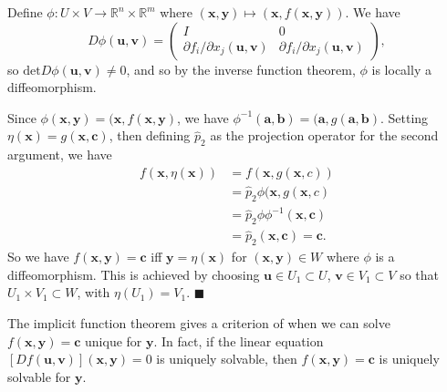 \documentclass[letter-paper]{tufte-book}
\newenvironment{proof}[1][Proof]{\begin{trivlist}
\item[\hskip \labelsep {\bfseries #1}]}{\end{trivlist}}
\newcommand{\qed}{\hfill$\blacksquare$}
\begin{document}
\begin{proof}
  Define $\phi : U \times V \to \mathbb{R}^n \times \mathbb{R}^m$ where
  $(\boldsymbol{x}, \boldsymbol{y}) \mapsto (\boldsymbol{x}, f(\boldsymbol{x},
  \boldsymbol{y}))$. We have
  \begin{equation*}
    D\phi(\boldsymbol{u}, \boldsymbol{v}) = \begin{pmatrix}I & 0 \\ \partial f_i/\partial x_j (\boldsymbol{u}, \boldsymbol{v}) & \partial f_i / \partial x_j (\boldsymbol{u}, \boldsymbol{v}) \end{pmatrix},
  \end{equation*}
  so $\mbox{det} D\phi(\boldsymbol{u}, \boldsymbol{v}) \neq 0$, and so by the
  inverse function theorem, $\phi$ is locally a diffeomorphism.
  
  Since $\phi(\boldsymbol{x}, \boldsymbol{y}) = (\boldsymbol{x},
  f(\boldsymbol{x}, \boldsymbol{y})$, we have $\phi^{-1}(\boldsymbol{a},
  \boldsymbol{b}) = (\boldsymbol{a}, g(\boldsymbol{a}, \boldsymbol{b})$. Setting
  $\eta(\boldsymbol{x}) = g(\boldsymbol{x}, \boldsymbol{c})$, then defining
  $\hat{p}_2$ as the projection operator for the second argument, we have
  \begin{align*}
    f(\boldsymbol{x}, \eta(\boldsymbol{x})) &= f(\boldsymbol{x}, g(\boldsymbol{x}, c)) \\
      &= \hat{p}_2 \phi(\boldsymbol{x}, g(\boldsymbol{x}, c) \\
      &= \hat{p}_2 \phi \phi^{-1} (\boldsymbol{x}, \boldsymbol{c}) \\
      &= \hat{p}_2(\boldsymbol{x}, \boldsymbol{c}) = \boldsymbol{c}.
  \end{align*}
  So we have $f(\boldsymbol{x}, \boldsymbol{y}) = \boldsymbol{c}$ iff
  $\boldsymbol{y} = \eta(\boldsymbol{x})$ for $(\boldsymbol{x}, \boldsymbol{y})
  \in W$ where $\phi$ is a diffeomorphism. This is achieved by choosing
  $\boldsymbol{u} \in U_1 \subset U$, $\boldsymbol{v} \in V_1 \subset V$ so that
  $U_1 \times V_1 \subset W$, with $\eta(U_1) = V_1$. \qed
\end{proof}

The implicit function theorem gives a criterion of when we can solve
$f(\boldsymbol{x}, \boldsymbol{y}) = \boldsymbol{c}$ unique for
$\boldsymbol{y}$. In fact, if the linear equation $[Df(\boldsymbol{u},
\boldsymbol{v})](\boldsymbol{x}, \boldsymbol{y}) = 0$ is uniquely solvable, then
$f(\boldsymbol{x}, \boldsymbol{y}) = \boldsymbol{c}$ is uniquely solvable for
$\boldsymbol{y}$.
\end{document}
